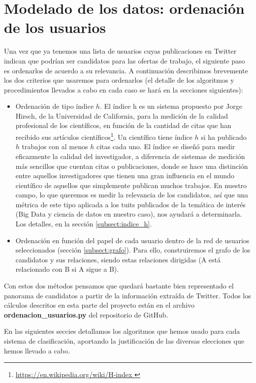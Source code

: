 \chapter{Modelado de los datos: ordenación de los usuarios}
\label{chap:ordenacion_de_usuarios}

Una vez que ya tenemos una lista de usuarios cuyas publicaciones en Twitter
indican que podrían ser candidatos para las ofertas de trabajo, el siguiente
paso es ordenarlos de acuerdo a su relevancia. A continuación describimos brevemente
los dos criterios que usaremos para ordenarlos (el detalle de los algoritmos y 
procedimientos llevados a cabo en cada caso se hará en la secciones siguientes):
\begin{itemize}
\item Ordenación de tipo índice $h$. El índice h es un sistema propuesto por Jorge Hirsch, de la Universidad de California, para la medición de la calidad profesional de los científicos, en función de la cantidad de citas que han recibido sus artículos científicos\footnote{\url{https://en.wikipedia.org/wiki/H-index }}. Un científico tiene índice $h$ si ha publicado $h$ trabajos con al menos $h$ citas cada uno. El índice se diseñó para medir eficazmente la calidad del investigador, a diferencia de sistemas de medición más sencillos que cuentan citas o publicaciones, donde se hace una distinción entre aquellos investigadores que tienen una gran influencia en el mundo científico de aquellos que simplemente publican muchos trabajos. En nuestro campo, lo que queremos es medir 
la relevancia de los candidatos, así que una métrica de este tipo aplicada a los tuits publicados
de la temática de interés (Big Data y ciencia de datos en nuestro caso), nos ayudará a determinarla.
Los detalles, en la sección \ref{subsect:indice_h}.

\item Ordenación en función del papel de cada usuario dentro de la red de usuarios
seleccionados (sección \ref{subsect:grafo}). Para ello, construiremos el grafo 
de los candidatos y sus relaciones, siendo estas relaciones dirigidas (A está relacionado
con B si A sigue a B).
\end{itemize}

Con estos dos métodos pensamos que quedará bastante bien representado el panorama
de candidatos a partir de la información extraída de Twitter. 
Todos los cálculos descritos en esta parte del proyecto están en el archivo
{\bf ordenacion\_usuarios.py} del repositorio de GitHub.

En las siguientes seccies detallamos los algoritmos que hemos usado para cada sistema de
clasificación, aportando la justificación de las diversas elecciones que 
hemos llevado a cabo.

